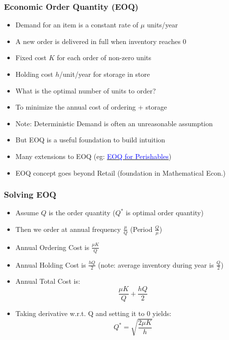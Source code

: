 \documentclass[handout]{beamer}
\begin{document}
\begin{frame}
\frametitle{Economic Order Quantity (EOQ)}
\pause
\begin{itemize}[<+->]
\item Demand for an item is a constant rate of $\mu$ units/year
\item A new order is delivered in full when inventory reaches 0
\item Fixed cost $K$ for each order of non-zero units
\item Holding cost $h$/unit/year for storage in store 
\item What is the optimal number of units to order?
\item To minimize the annual cost of ordering + storage
\item Note: Deterministic Demand is often an unreasonable assumption
\item But EOQ is a useful foundation to build intuition
\item Many extensions to EOQ (eg: \href{https://github.com/coverdrive/technical-documents/blob/master/supply_chain/EOQSpoilage/EOQSpoilage.pdf}{\underline{\textcolor{blue}{EOQ for Perishables}}})
\item EOQ concept goes beyond Retail (foundation in Mathematical Econ.)
\end{itemize}
\end{frame}

\begin{frame}
\frametitle{Solving EOQ}
\pause
\begin{itemize}[<+->]
\item Assume $Q$ is the order quantity ($Q^*$ is optimal order quantity)
\item Then we order at annual frequency $\frac \mu Q$ (Period $\frac Q \mu$)
\item Annual Ordering Cost is $ \frac {\mu K} Q$
\item Annual Holding Cost is $\frac {hQ} 2$ (note: average inventory during year is $\frac Q 2$)
\item Annual Total Cost is:
$$\frac {\mu K} Q + \frac {hQ} 2$$
\item Taking derivative w.r.t. Q and setting it to 0 yields:
$$Q^* = \sqrt{\frac {2 \mu K} h}$$
\end{itemize}
\end{frame}
\end{document}
